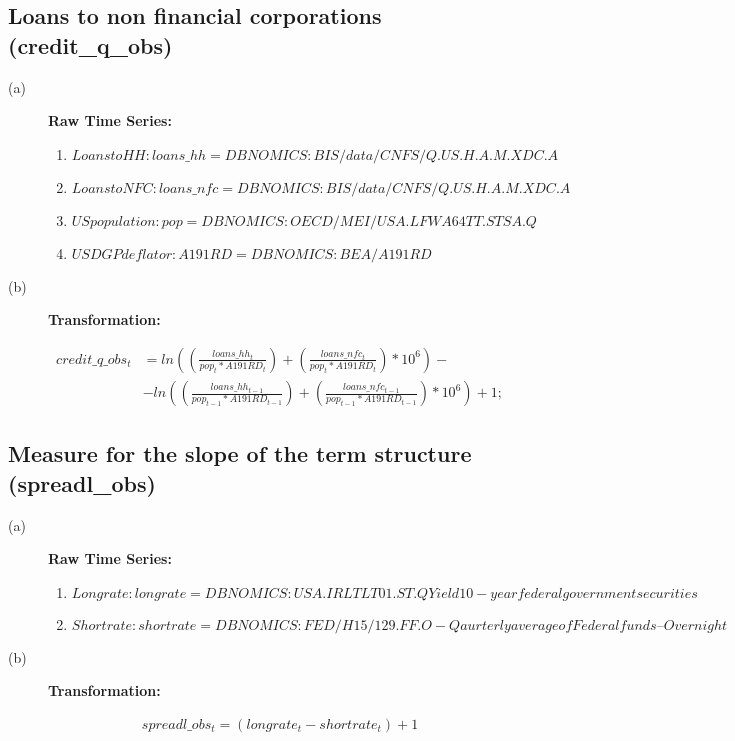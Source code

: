 \documentclass[3p,review,times]{elsarticle}		%
\begin{document}
\subsection{Loans to non financial corporations (credit\_q\_obs)}
\begin{description}
	\item[(a)] \textbf{Raw Time Series:}
	\begin{enumerate}
	\item $ Loans to HH: loans\_hh = DBNOMICS: BIS/data/CNFS/Q.US.H.A.M.XDC.A$
    \item $ Loans to NFC: loans\_nfc = DBNOMICS: BIS/data/CNFS/Q.US.H.A.M.XDC.A$
    \item $ US population: pop = DBNOMICS: OECD/MEI/USA.LFWA64TT.STSA.Q$
    \item $ US DGP deflator: A191RD = DBNOMICS: BEA/A191RD$
			
	\end{enumerate}
	\item[(b)] \textbf{Transformation:}

		\begin{align*}
			credit\_q\_obs_{t}&=ln\left( \left(\frac{loans\_hh_t}{pop_t*A191RD_t}\right) + \left(\frac{loans\_nfc_t}{pop_t*A191RD_t}\right) *10^6\right) - \\
		&-	ln\left(\left(\frac{loans\_hh_{t-1}}{pop_{t-1}*A191RD_{t-1}}\right) + \left(\frac{loans\_nfc_{t-1}}{pop_{t-1}*A191RD_{t-1}}\right) *10^6\right) +1;
\end{align*} 
\end{description}


\subsection{Measure for the slope of the term structure (spreadl\_obs)}
\begin{description}
	\item[(a)] \textbf{Raw Time Series:}
	\begin{enumerate}
		\item $ Long rate : longrate =DBNOMICS: USA.IRLTLT01.ST.Q Yield 10-year federal government securities$
		\item $ Short rate: shortrate = DBNOMICS: FED/H15/129.FF.O - Qaurterly average of Federal funds – Overnight$
		
	\end{enumerate}
	\item[(b)] \textbf{Transformation:}
	
	\begin{align*}
	spreadl\_obs_t = (longrate_t - shortrate_t) +1
	\end{align*} 
\end{description}
\end{document}
